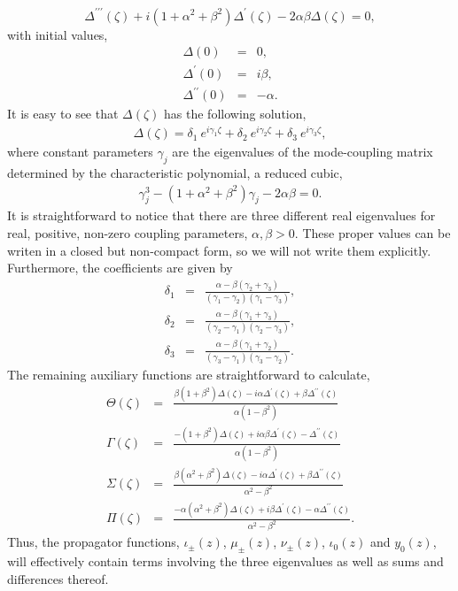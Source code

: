 \documentclass[9pt,twocolumn,twoside]{osajnl}
\begin{document}
\begin{equation}
\Delta^{\prime\prime\prime}(\zeta) + i(1+\alpha^2+\beta^2)\Delta ^{\prime}(\zeta) -2 \alpha\beta\Delta(\zeta) = 0,\label{eq:ddiff}
\end{equation}
with initial values,
\begin{eqnarray}
\Delta(0) & = & 0, \\
\Delta^{\prime}(0) &=& i\beta, \\
\Delta^{\prime\prime}(0) &=& -\alpha.
\end{eqnarray}
It is easy to see that $\Delta(\zeta)$ has the following solution,
\begin{eqnarray}
\Delta(\zeta) = \delta_{1} \: e^{i \gamma_1 \zeta} + \delta_{2} \: e^{i \gamma_2 \zeta} +  \delta_{3} \: e^{i \gamma_3 \zeta},
\end{eqnarray}  
where constant parameters  $\gamma_{j}$ are the eigenvalues of the mode-coupling matrix determined by the characteristic polynomial, a reduced cubic,
\begin{eqnarray}
\gamma_{j}^{3} - (1+ \alpha^{2} + \beta^{2}) \gamma_{j} - 2 \alpha \beta = 0. \label{eq:poly}
\end{eqnarray}
It is straightforward to notice that there are three different real eigenvalues for real, positive, non-zero coupling parameters, $\alpha, \beta > 0$.
These proper values can be writen in a closed but non-compact form, so we will not write them explicitly.
Furthermore, the coefficients are given by
\begin{eqnarray}
\delta_{1} &=& \frac{\alpha-\beta(\gamma_2+\gamma_3)}{(\gamma_1-\gamma_2)(\gamma_1-\gamma_3)},\\
\delta_{2} &=& \frac{\alpha-\beta(\gamma_1+\gamma_3)}{(\gamma_2-\gamma_1)(\gamma_2-\gamma_3)},\\
\delta_{3} &=& \frac{\alpha-\beta(\gamma_1+\gamma_2)}{(\gamma_3-\gamma_1)(\gamma_3-\gamma_2)}. 
\end{eqnarray}  
The remaining auxiliary functions are straightforward to calculate, 
\begin{eqnarray}
\Theta(\zeta)&=& \frac{\beta(1+\beta^2)\Delta(\zeta) - i \alpha\Delta^{\prime}(\zeta)+\beta\Delta^{\prime\prime}(\zeta)}
	{\alpha(1-\beta^2)}  \\
\Gamma(\zeta)&=& \frac{-(1+\beta^2)\Delta(\zeta) +i \alpha\beta\Delta^{\prime}(\zeta)-\Delta^{\prime\prime}(\zeta)}
	{\alpha(1-\beta^2)} \\
\Sigma(\zeta)&=& \frac{\beta(\alpha^2+\beta^2)\Delta(\zeta) -i \alpha\Delta^{\prime}(\zeta)+\beta\Delta^{\prime\prime}(\zeta)}
	{\alpha^2-\beta^2}  \\
\Pi(\zeta)&=& \frac{-\alpha(\alpha^2+\beta^2)\Delta(\zeta) +i \beta\Delta^{\prime}(\zeta)-\alpha\Delta^{\prime\prime}(\zeta)}
	{\alpha^2-\beta^2}.
\end{eqnarray} 
Thus, the propagator functions, $\iota_{\pm}(z)$, $\mu_{\pm}(z)$, $\nu_{\pm}(z)$, $\iota_{0}(z)$ and $y_{0}(z)$, will effectively contain terms involving the three eigenvalues as well as sums and differences thereof.
\end{document}

